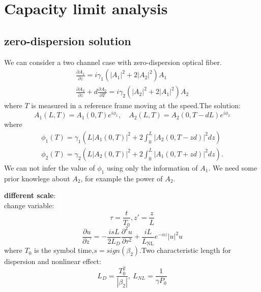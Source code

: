 
\section{Capacity limit analysis}

\subsection{zero-dispersion solution}
We can consider a two channel case with zero-dispersion optical fiber.
$$
\begin{array}{r}
\frac{\partial A_{1}}{\partial z} = i \gamma_{1}\left(\left|A_{1}\right|^{2}+2\left|A_{2}\right|^{2}\right) A_{1} \\
\frac{\partial A_{2}}{\partial z}+d \frac{\partial A_{2}}{\partial T} =i \gamma_{2}\left(\left|A_{2}\right|^{2}+2\left|A_{1}\right|^{2}\right) A_{2}
\end{array}
$$
where $T$ is measured in a reference frame moving at the speed.The solution:
$$
A_{1}(L, T)=A_{1}(0, T) e^{i \phi_{1}}, \quad A_{2}(L, T)=A_{2}(0, T-d L) e^{i \phi_{2}}
$$
where 
$$
\begin{array}{l}
\phi_{1}(T)=\gamma_{1}\left(L\left|A_{1}(0, T)\right|^{2}+2 \int_{0}^{L}\left|A_{2}(0, T-z d)\right|^{2} d z\right) \\
\phi_{2}(T)=\gamma_{2}\left(L\left|A_{2}(0, T)\right|^{2}+2 \int_{0}^{L}\left|A_{1}(0, T+z d)\right|^{2} d z\right) .
\end{array}
$$
We can not infer the value of $\phi_1$ using only the information of $A_1$. We need some prior knowlege about $A_2$, for example the power of $A_2$.

\textbf{different scale}: \\
change variable:
$$
\tau = \frac{t}{T_0}, z' = \frac{z}{L}
$$
$$
\frac{\partial u}{\partial z^{\prime}}=-\frac{i s L}{2 L_{D}} \frac{\partial^{2} u}{\partial \tau^{2}}+\frac{i L}{L_{\mathrm{NL}}} e^{-\alpha z}|u|^{2} u
$$
where $T_0$ is the symbol time,$s=sign(\beta_2)$.Two characteristic length for dispersion and nonlinear effect:
$$
L_D = \frac{T_0^2}{|\beta_2|}, \ L_{NL} = \frac{1}{\gamma P_0}
$$


